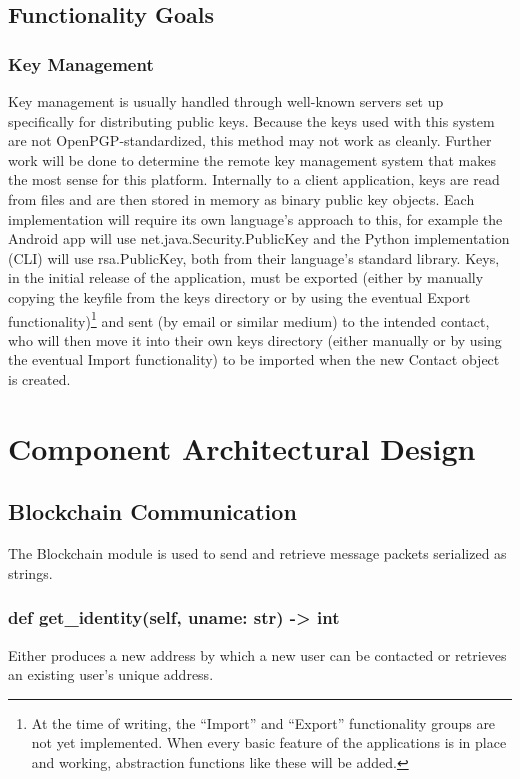 \documentclass[titlepage]{report}
\begin{document}
\subsection{Functionality Goals}
\subsubsection{Key Management}
Key management is usually handled through well-known servers set up specifically for distributing public keys. Because the keys used with this system are not OpenPGP-standardized, this method may not work as cleanly. Further work will be done to determine the remote key management system that makes the most sense for this platform. Internally to a client application, keys are read from files and are then stored in memory as binary public key objects. Each implementation will require its own language's approach to this, for example the Android app will use net.java.Security.PublicKey and the Python implementation (CLI) will use rsa.PublicKey, both from their language's standard library. Keys, in the initial release of the application, must be exported (either by manually copying the keyfile from the keys directory or by using the eventual Export functionality)\footnote{At the time of writing, the ``Import'' and ``Export'' functionality groups are not yet implemented. When every basic feature of the applications is in place and working, abstraction functions like these will be added.} and sent (by email or similar medium) to the intended contact, who will then move it into their own keys directory (either manually or by using the eventual Import functionality) to be imported when the new Contact object is created.

\section{Component Architectural Design}

\subsection{Blockchain Communication}
The Blockchain module is used to send and retrieve message packets serialized as strings.

\subsubsection{def get\_identity(self, uname: str) -> int}
Either produces a new address by which a new user can be contacted or retrieves an existing user's unique address.
\end{document}
